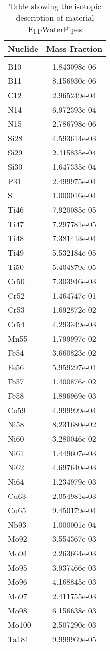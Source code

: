 \begin{centering}
\begin{table}[ht!]
\begin{tabular}{l | c}
\hline
Nuclide & Mass Fraction\\
\hline
\\
B10 & 1.843098e-06\\
B11 & 8.156930e-06\\
C12 & 2.965249e-04\\
N14 & 6.972393e-04\\
N15 & 2.786798e-06\\
Si28 & 4.593614e-03\\
Si29 & 2.415835e-04\\
Si30 & 1.647335e-04\\
P31 & 2.499975e-04\\
S & 1.000016e-04\\
Ti46 & 7.920085e-05\\
Ti47 & 7.297781e-05\\
Ti48 & 7.381413e-04\\
Ti49 & 5.532184e-05\\
Ti50 & 5.404879e-05\\
Cr50 & 7.303946e-03\\
Cr52 & 1.464747e-01\\
Cr53 & 1.692872e-02\\
Cr54 & 4.293349e-03\\
Mn55 & 1.799997e-02\\
Fe54 & 3.660823e-02\\
Fe56 & 5.959297e-01\\
Fe57 & 1.400876e-02\\
Fe58 & 1.896969e-03\\
Co59 & 4.999999e-04\\
Ni58 & 8.231680e-02\\
Ni60 & 3.280046e-02\\
Ni61 & 1.449607e-03\\
Ni62 & 4.697640e-03\\
Ni64 & 1.234979e-03\\
Cu63 & 2.054981e-03\\
Cu65 & 9.450179e-04\\
Nb93 & 1.000001e-04\\
Mo92 & 3.554367e-03\\
Mo94 & 2.263664e-03\\
Mo95 & 3.937466e-03\\
Mo96 & 4.168845e-03\\
Mo97 & 2.411755e-03\\
Mo98 & 6.156638e-03\\
Mo100 & 2.507290e-03\\
Ta181 & 9.999969e-05
\end{tabular}
\caption{Table showing the isotopic description of material EppWaterPipes}
\label{table:material_EppWaterPipes}
\end{table}\clearpage


\end{centering}
